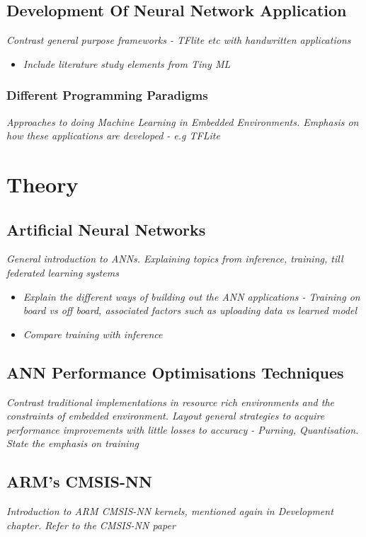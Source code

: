 \section[Development of Neural Network Application]{Development Of Neural Network Application}
\textit{Contrast general purpose frameworks - TFlite etc with handwritten applications}

\begin{itemize}
	\item \textit{Include literature study elements from Tiny ML}
\end{itemize}

\subsection{Different Programming Paradigms}
\textit{Approaches to doing Machine Learning in Embedded Environments. Emphasis on how these applications are developed - e.g TFLite}

\chapter{Theory}

\section[Artificial Neural Network (ANN)]{Artificial Neural Networks}
\textit{General introduction to ANNs. Explaining topics from inference, training, till federated learning systems}

\begin{itemize}
	\item \textit{Explain the different ways of building out the ANN applications - Training on board vs off board, associated factors such as uploading data vs learned model}
	\item \textit{Compare training with inference}
\end{itemize}

\section{ANN Performance Optimisations Techniques}
\textit{Contrast traditional implementations in resource rich environments and the constraints of embedded environment. Layout general strategies to acquire performance improvements with little losses to accuracy - Purning, Quantisation. State the emphasis on training}

\section{ARM's CMSIS-NN}
\textit{Introduction to ARM CMSIS-NN kernels, mentioned again in Development chapter. Refer to the CMSIS-NN paper}

